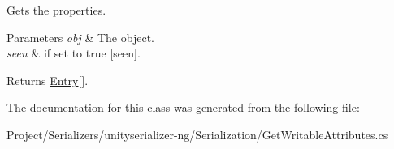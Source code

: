 Gets the properties. 


\begin{DoxyParams}{Parameters}
{\em obj} & The object.\\
\hline
{\em seen} & if set to {\ttfamily true} \mbox{[}seen\mbox{]}.\\
\hline
\end{DoxyParams}
\begin{DoxyReturn}{Returns}
\hyperlink{class_serialization_1_1_entry}{Entry}\mbox{[}\mbox{]}.
\end{DoxyReturn}


The documentation for this class was generated from the following file\+:\begin{DoxyCompactItemize}
\item 
Project/\+Serializers/unityserializer-\/ng/\+Serialization/Get\+Writable\+Attributes.\+cs\end{DoxyCompactItemize}
